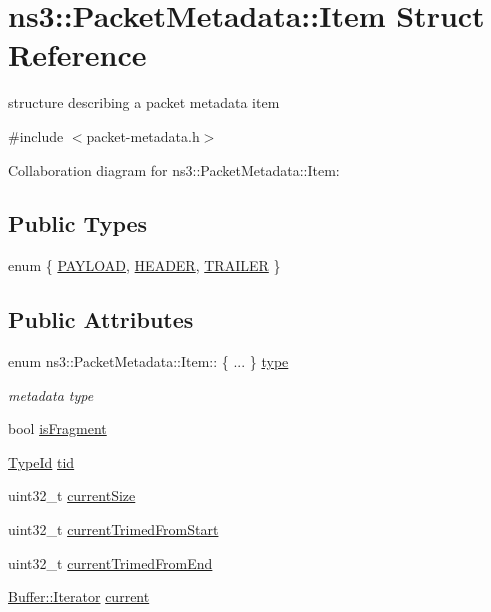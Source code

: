 \hypertarget{structns3_1_1PacketMetadata_1_1Item}{}\section{ns3\+:\+:Packet\+Metadata\+:\+:Item Struct Reference}
\label{structns3_1_1PacketMetadata_1_1Item}


structure describing a packet metadata item  




{\ttfamily \#include $<$packet-\/metadata.\+h$>$}



Collaboration diagram for ns3\+:\+:Packet\+Metadata\+:\+:Item\+:
\subsection*{Public Types}
\begin{DoxyCompactItemize}
\item 
enum \{ \hyperlink{structns3_1_1PacketMetadata_1_1Item_ab0a06781a8793079afeab58a9a9b3174ac2bc28ee0adb79d428d3f5a11be52f80}{P\+A\+Y\+L\+O\+AD}, 
\hyperlink{structns3_1_1PacketMetadata_1_1Item_ab0a06781a8793079afeab58a9a9b3174a35a76b7dc57ca42587ecfb5f81f1bcb2}{H\+E\+A\+D\+ER}, 
\hyperlink{structns3_1_1PacketMetadata_1_1Item_ab0a06781a8793079afeab58a9a9b3174ab32282a2f84adad5e57549c03179ff45}{T\+R\+A\+I\+L\+ER}
 \}
\end{DoxyCompactItemize}
\subsection*{Public Attributes}
\begin{DoxyCompactItemize}
\item 
enum ns3\+::\+Packet\+Metadata\+::\+Item\+:: \{ ... \}  \hyperlink{structns3_1_1PacketMetadata_1_1Item_a76d4fe6402891fd8d840442d51b0f6a0}{type}
\begin{DoxyCompactList}\small\item\em metadata type \end{DoxyCompactList}\item 
bool \hyperlink{structns3_1_1PacketMetadata_1_1Item_a26a638c974e533c90a41687217df2574}{is\+Fragment}
\item 
\hyperlink{classns3_1_1TypeId}{Type\+Id} \hyperlink{structns3_1_1PacketMetadata_1_1Item_a07dac03d1aa1be885295bdfd113f78e7}{tid}
\item 
uint32\+\_\+t \hyperlink{structns3_1_1PacketMetadata_1_1Item_afe99c84baf1db382630fab75a464fc63}{current\+Size}
\item 
uint32\+\_\+t \hyperlink{structns3_1_1PacketMetadata_1_1Item_a869b374807faf214a990ff591be8c693}{current\+Trimed\+From\+Start}
\item 
uint32\+\_\+t \hyperlink{structns3_1_1PacketMetadata_1_1Item_a330aa45f4eec52e6d2615c275e878096}{current\+Trimed\+From\+End}
\item 
\hyperlink{classns3_1_1Buffer_1_1Iterator}{Buffer\+::\+Iterator} \hyperlink{structns3_1_1PacketMetadata_1_1Item_aa8c1eed1363b2965204125b91659f639}{current}
\end{DoxyCompactItemize}


